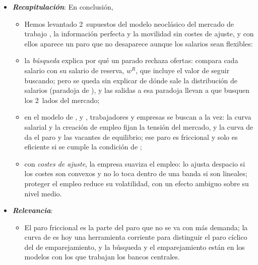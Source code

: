 \documentclass[11pt]{article}
\begin{document}
\begin{itemize}
\item \textbf{\emph{Recapitulación}}: En conclusión,
  \begin{itemize}
  \item Hemos levantado 2~supuestos del modelo neoclásico del mercado de trabajo , la información perfecta y la movilidad sin costes de ajuste, y con ellos aparece un paro que no desaparece aunque los salarios sean flexibles:
  \item la \emph{búsqueda} explica por qué un parado rechaza ofertas: compara cada salario con su salario de reserva, $w^R$, que incluye el valor de seguir buscando; pero se queda sin explicar de dónde sale la distribución de salarios (paradoja de ), y las salidas a esa paradoja llevan a que busquen los 2~lados del mercado;
  \item en el modelo de ,  y , trabajadores y empresas se buscan a la vez: la curva salarial y la creación de empleo fijan la tensión del mercado, y la curva de  da el paro y las vacantes de equilibrio; ese paro es friccional y solo es eficiente si se cumple la condición de ;
  \item con \emph{costes de ajuste}, la empresa suaviza el empleo: lo ajusta despacio si los costes son convexos y no lo toca dentro de una banda si son lineales; proteger el empleo reduce su volatilidad, con un efecto ambiguo sobre su nivel medio.
  \end{itemize}
\item \textbf{\emph{Relevancia}}:
  \begin{itemize}
  \item El paro friccional es la parte del paro que no se va con más demanda; la curva de  es hoy una herramienta corriente para distinguir el paro cíclico del de emparejamiento, y la búsqueda y el emparejamiento están en los modelos con los que trabajan los bancos centrales.


\end{itemize}
\end{itemize}
\end{document}
